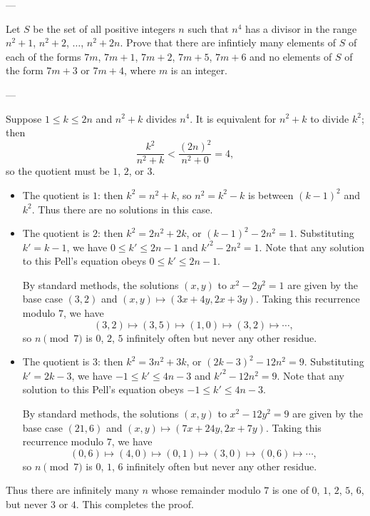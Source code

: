 
---

Let $S$ be the set of all positive integers $n$ such that $n^4$ has a divisor in the range $n^2+1$, $n^2+2$, $\ldots$, $n^2+2n$. Prove that there are infintiely many elements of $S$ of each of the forms $7m$, $7m+1$, $7m+2$, $7m+5$, $7m+6$ and no elements of $S$ of the form $7m+3$ or $7m+4$, where $m$ is an integer.

---

Suppose $1\le k\le 2n$ and $n^2+k$ divides $n^4$. It is equivalent for $n^2+k$ to divide $k^2$; then \[\frac{k^2}{n^2+k}<\frac{(2n)^2}{n^2+0}=4,\]
so the quotient must be $1$, $2$, or $3$.
\begin{itemize}
    \item The quotient is $1$: then $k^2=n^2+k$, so $n^2=k^2-k$ is between $(k-1)^2$ and $k^2$. Thus there are no solutions in this case.
    \item The quotient is $2$: then $k^2=2n^2+2k$, or $(k-1)^2-2n^2=1$. Substituting $k'=k-1$, we have $0\le k'\le2n-1$ and $k'^2-2n^2=1$. Note that any solution to this Pell's equation obeys $0\le k'\le2n-1$.

        By standard methods, the solutions $(x,y)$ to $x^2-2y^2=1$ are given by the base case $(3,2)$ and $(x,y)\mapsto(3x+4y,2x+3y)$. Taking this recurrence modulo $7$, we have \[(3,2)\mapsto(3,5)\mapsto(1,0)\mapsto(3,2)\mapsto\cdots,\]
        so $n\pmod7$ is $0$, $2$, $5$ infinitely often but never any other residue.
    \item The quotient is $3$: then $k^2=3n^2+3k$, or $(2k-3)^2-12n^2=9$. Substituting $k'=2k-3$, we have $-1\le k'\le4n-3$ and $k'^2-12n^2=9$. Note that any solution to this Pell's equation obeys $-1\le k'\le4n-3$.

        By standard methods, the solutions $(x,y)$ to $x^2-12y^2=9$ are given by the base case $(21,6)$ and $(x,y)\mapsto(7x+24y,2x+7y)$. Taking this recurrence modulo $7$, we have \[(0,6)\mapsto(4,0)\mapsto(0,1)\mapsto(3,0)\mapsto(0,6)\mapsto\cdots,\]
        so $n\pmod7$ is $0$, $1$, $6$ infinitely often but never any other residue.
\end{itemize}
Thus there are infinitely many $n$ whose remainder modulo $7$ is one of $0$, $1$, $2$, $5$, $6$, but never $3$ or $4$. This completes the proof.

